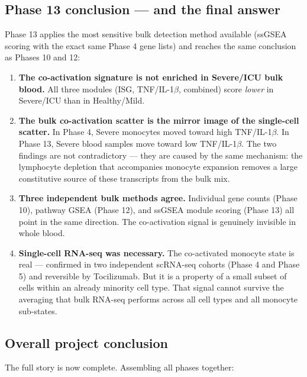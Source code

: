 \documentclass[11pt, a4paper]{article}
\begin{document}
\subsection{Phase 13 conclusion — and the final answer}

Phase 13 applies the most sensitive bulk detection method available
(ssGSEA scoring with the exact same Phase 4 gene lists) and reaches the same
conclusion as Phases 10 and 12:

\begin{enumerate}[nosep]
  \item \textbf{The co-activation signature is not enriched in Severe/ICU
        bulk blood.} All three modules (ISG, TNF/IL-1$\beta$, combined) score
        \textit{lower} in Severe/ICU than in Healthy/Mild.

  \item \textbf{The bulk co-activation scatter is the mirror image of the
        single-cell scatter.} In Phase 4, Severe monocytes moved toward
        high TNF/IL-1$\beta$. In Phase 13, Severe blood samples move toward
        low TNF/IL-1$\beta$. The two findings are not contradictory — they
        are caused by the same mechanism: the lymphocyte depletion that
        accompanies monocyte expansion removes a large constitutive source
        of these transcripts from the bulk mix.

  \item \textbf{Three independent bulk methods agree.}
        Individual gene counts (Phase 10), pathway GSEA (Phase 12), and
        ssGSEA module scoring (Phase 13) all point in the same direction.
        The co-activation signal is genuinely invisible in whole blood.

  \item \textbf{Single-cell RNA-seq was necessary.}
        The co-activated monocyte state is real — confirmed in two independent
        scRNA-seq cohorts (Phase 4 and Phase 5) and reversible by Tocilizumab.
        But it is a property of a small subset of cells within an already
        minority cell type. That signal cannot survive the averaging that
        bulk RNA-seq performs across all cell types and all monocyte sub-states.
\end{enumerate}

\subsection{Overall project conclusion}

The full story is now complete. Assembling all phases together:
\end{document}
